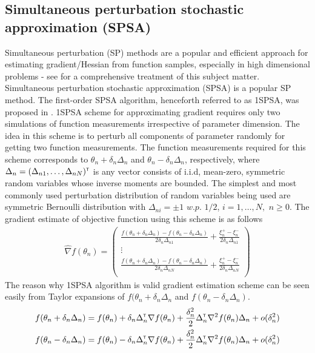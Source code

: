 \subsection{Simultaneous perturbation stochastic approximation (SPSA)}
Simultaneous perturbation (SP) methods are a popular and efficient approach for estimating gradient/Hessian from function samples, especially in high dimensional problems - see \cite{bhatnagar-book} for a comprehensive treatment of this subject matter. Simultaneous perturbation stochastic approximation (SPSA) is a popular SP method. The first-order SPSA algorithm, henceforth referred to as 1SPSA, was proposed in \cite{spall2005introduction}.  1SPSA scheme for approximating gradient requires only two simulations of function measurements irrespective of parameter dimension. The idea in this scheme is to perturb all components of parameter randomly for getting two function measurements. The function measurements required for this scheme corresponds to $\theta_n + \delta_n \Delta_n$ and $\theta_n - \delta_n \Delta_n$, respectively, where $\Delta_n = (\Delta_{n1},\ldots,\Delta_{nN})^\mathsf{\scriptscriptstyle T}$ is any vector consists of i.i.d, mean-zero, symmetric random variables whose inverse moments are bounded. The simplest and most commonly used perturbation distribution of random variables being used are symmetric Bernoulli distribution with $\Delta_{ni} = \pm 1 \,\,w.p.\,\,1/2$, $i=1,\ldots,N,\,\, n\ge 0$. The gradient estimate of objective function using this scheme is as follows
\begin{align}\label{eq:spsa}
 \widehat{\nabla} f(\theta_{n}) = \left(
\begin{array}{c}
\frac{f(\theta_n+\delta_n \Delta_n)-f(\theta_n-\delta_n \Delta_n)}{2\delta_n \Delta_{n1}} + \frac{\xi_{n}^+ - \xi_{n}^-}{2\delta_n \Delta_{n1}}\\
\vdots\\
\frac{f(\theta_n+\delta_n \Delta_n)-f(\theta_n-\delta_n \Delta_n)}{2\delta_n \Delta_{nN}} +  \frac{\xi_{n}^+ - \xi_{n}^-}{2\delta_n \Delta_{nN}}\\
\end{array}
\right)
\end{align}
The reason why 1SPSA algorithm is valid gradient estimation scheme can be seen easily from Taylor expansions of $f(\theta_n+\delta_n \Delta_n$ and $f(\theta_n-\delta_n \Delta_n)$.
\begin{align*}
&f(\theta_n + \delta_n \Delta_n) = f(\theta_n) + \delta_n \Delta_n^\mathsf{\scriptscriptstyle T} \nabla f(\theta_n) + \frac{\delta_n^2}{2} \Delta_n^\mathsf{\scriptscriptstyle T} \nabla^2 f(\theta_n) \Delta_n + o(\delta_n^2)\\
&f(\theta_n - \delta_n \Delta_n) = f(\theta_n) - \delta_n \Delta_n^\mathsf{\scriptscriptstyle T} \nabla f(\theta_n) + \frac{\delta_n^2}{2} \Delta_n^\mathsf{\scriptscriptstyle T} \nabla^2 f(\theta_n) \Delta_n + o(\delta_n^2)
\end{align*}
